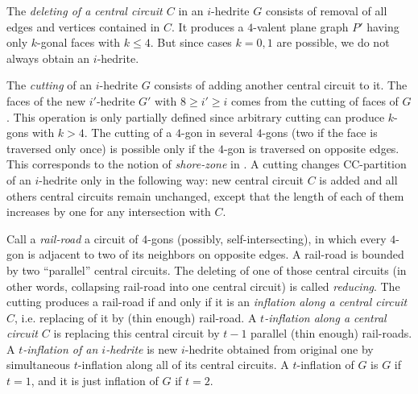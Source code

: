 \documentclass[12pt]{article}
\begin{document}
%
%
%
%
%


The {\em deleting of a central circuit $C$} in an $i$-hedrite $G$ consists 
of removal of all edges and vertices contained in $C$. It produces a 
$4$-valent plane graph $P'$ having only $k$-gonal faces 
with $k \leq 4$. But since cases $k=0,1$ are possible, we do not
always obtain an $i$-hedrite.


The {\em cutting} of an $i$-hedrite $G$ consists of adding another central 
circuit to it. The faces of the new $i'$-hedrite $G'$ with $8\geq i'\geq i$ 
comes from the cutting of faces of $G$. This operation is only partially
defined since arbitrary cutting can produce $k$-gons with $k>4$. The 
cutting of a $4$-gon in several $4$-gons (two if the face
is traversed only once) is possible only if the $4$-gon is traversed 
on opposite edges. This corresponds to the notion of {\it shore-zone} 
in \cite{DSt}.
A cutting changes CC-partition of an $i$-hedrite only in the following 
way: new central circuit $C$ is added and all others central circuits 
remain unchanged, except that the length of each of them increases by one 
for any intersection with $C$. 


Call a {\em rail-road} a circuit of $4$-gons (possibly, self-intersecting), 
in which every $4$-gon is adjacent to two of its neighbors on opposite
edges. A rail-road is bounded by two ``parallel'' central circuits.
The deleting of  one of those central circuits (in other words, collapsing
rail-road into one central circuit) is called {\em reducing}.
The cutting produces a rail-road if and only if it is an {\em inflation 
along a central circuit $C$}, i.e. replacing of it by (thin enough) 
rail-road. A {\em $t$-inflation along a central circuit $C$} is replacing
this central circuit by $t-1$ parallel (thin enough) rail-roads.
A {\em $t$-inflation of an $i$-hedrite} is new $i$-hedrite
obtained from original one by simultaneous $t$-inflation along all
of its central circuits. 
A $t$-inflation of $G$ is $G$ if $t=1$, and it is just inflation of $G$ 
if $t=2$.
\end{document}
